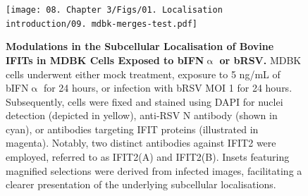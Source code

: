 \begin{figure}
    \centering
    \texttt{[image: 08. Chapter 3/Figs/01. Localisation introduction/09. mdbk-merges-test.pdf]}
    \caption[Modulations in the Subcellular Localisation of Bovine IFITs in MDBK Cells Exposed to bIFN$\upalpha$ or bRSV.]{\textbf{Modulations in the Subcellular Localisation of Bovine IFITs in MDBK Cells Exposed to bIFN$\upalpha$ or bRSV.} MDBK cells underwent either mock treatment, exposure to 5 ng/mL of bIFN$\upalpha$ for 24 hours, or infection with bRSV MOI 1 for 24 hours. Subsequently, cells were fixed and stained using DAPI for nuclei detection (depicted in yellow), anti-RSV N antibody (shown in cyan), or antibodies targeting IFIT proteins (illustrated in magenta). Notably, two distinct antibodies against IFIT2 were employed, referred to as IFIT2(A) and IFIT2(B). Insets featuring magnified selections were derived from infected images, facilitating a clearer presentation of the underlying subcellular localisations.}
    \label{fig:Modulations in the Subcellular Localisation of Bovine IFITs in MDBK Cells Exposed to bIFNa or bRSV}
\end{figure}

